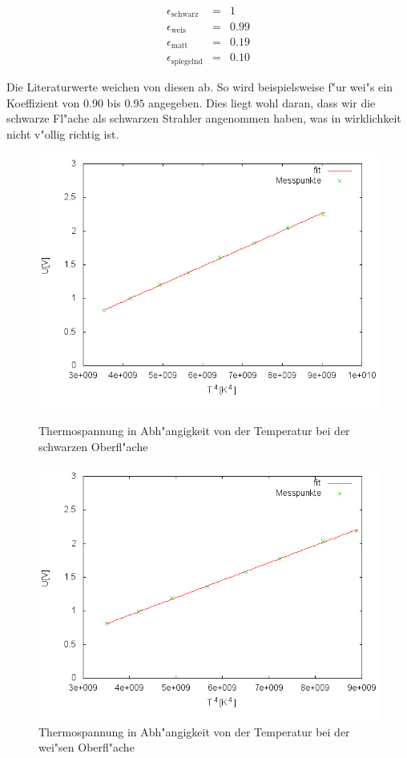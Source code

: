 	\begin{eqnarray*}
		\epsilon_\text{schwarz} &=& 1\\
		\epsilon_\text{weis} &=& 0.99\\
		\epsilon_\text{matt} &=& 0.19\\
		\epsilon_\text{spiegelnd} &=& 0.10
	\end{eqnarray*}

	Die Literaturwerte \cite{emission} weichen von diesen ab.
	So wird beispielsweise f"ur wei"s ein Koeffizient von $0.90$ bis $0.95$ angegeben.
	Dies liegt wohl daran, dass wir die schwarze Fl"ache als schwarzen Strahler angenommen haben, was in wirklichkeit nicht v"ollig richtig ist.

	\begin{figure}[htbp]
		\centering
		\includegraphics[width = 12cm]{img/schwarz.png}
		\caption{Thermospannung in Abh"angigkeit von der Temperatur bei der schwarzen Oberfl"ache}
		\label{schwarz_graph}

		\centering
		\includegraphics[width = 12cm]{img/weiss.png}
		\caption{Thermospannung in Abh"angigkeit von der Temperatur bei der wei"sen Oberfl"ache}
		\label{weis_graph}
	\end{figure}

